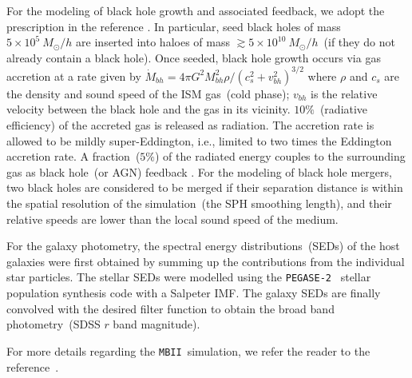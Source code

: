 \documentclass{natureprintstyle}
\newcommand{\mbii}{\texttt{MBII}}
\begin{document}
For the modeling of black hole growth and associated feedback, we adopt the prescription in the reference \cite{2005Natur.433..604D, 2005MNRAS.361..776S}. In particular, seed black holes of mass $5\times 10^{5}~M_{\odot}/h$ are inserted into haloes of mass $\gtrsim 5\times 10^{10}~M_{\odot}/h$~(if they do not already contain a black hole). Once seeded, black hole growth occurs via gas accretion at a rate given by $\dot{M}_{bh}={4\pi G^2 M_{bh}^2 \rho}/{(c_s^2+v_{bh}^2)^{3/2}}$ where $\rho$ and $c_s$ are the density and sound speed of the ISM gas~(cold phase); $v_{bh}$ is the relative velocity between the black hole and the gas in its vicinity. $10\%$~(radiative efficiency) of the accreted gas is released as radiation. The accretion rate is allowed to be mildly super-Eddington, i.e., limited to two times the Eddington accretion rate. A fraction~($5\%$) of the radiated energy couples to the surrounding gas as black hole~(or AGN) feedback \cite{2005Natur.433..604D}. For the modeling of black hole mergers, two black holes are considered to be merged if their separation distance is within the spatial resolution of the simulation~(the SPH smoothing length), and their relative speeds are lower than the local sound speed of the medium.

For the galaxy photometry, the spectral energy distributions~(SEDs) of the host galaxies were first obtained by summing up the contributions from the individual star particles. The stellar SEDs were modelled using the \texttt{PEGASE-2}~\cite{1999astro.ph.12179F} stellar population synthesis code with a Salpeter IMF. The galaxy SEDs are finally convolved with the desired filter function to obtain the broad band photometry~(SDSS $r$ band magnitude). 

For more details regarding the \mbii\ simulation, we refer the reader to the reference~\cite{2015MNRAS.450.1349K}.
\end{document}
